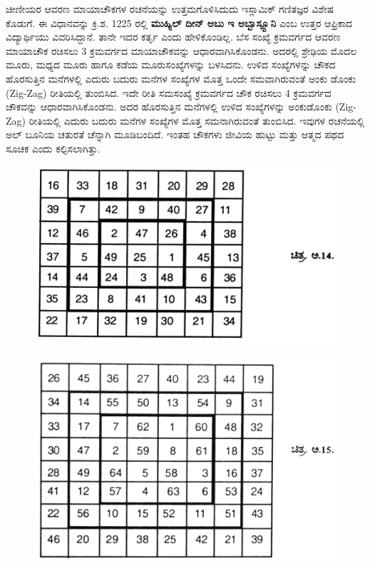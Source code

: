 ಚೀಣೀಯರ ಆವರಣ ಮಾಯಾಚೌಕಗಳ ರಚನೆಯನ್ನು ಉತ್ತಮಗೊಳಿಸಿದುದು ಇಸ್ಲಾಮಿಕ್ ಗಣಿತಜ್ಞರ ವಿಶೇಷ ಕೊಡುಗೆ. ಈ ವಿಧಾನವನ್ನು ಕ್ರಿ.ಶ. 1225 ರಲ್ಲಿ \textbf{ಮುಹ್ಯಿಲ್ ದೀನ್ ಅಬು ಇ ಅಬ್ಬಾಸ್ಲ್ಬೂನಿ } ಎಂಬ ಉತ್ತರ ಆಫ್ರಿಕಾದ ವಿದ್ಯಾರ್ಥಿಯು ವಿವರಿಸಿದ್ದಾನೆ. ತಾನೇ ಇದರ ಕರ್ತೃ ಎಂದು ಹೇಳಿಕೊಂಡಿಲ್ಲ. ಬೆಸ ಸಂಖ್ಯೆ ಕ್ರಮವರ್ಗದ ಆವರಣ ಮಾಯಾಚೌಕ ರಚಿಸಲು 3 ಕ್ರಮವರ್ಗದ ಮಾಯಾಚೌಕವನ್ನು ಆಧಾರವಾಗಿಸಿಕೊಂಡನು. ಅದರಲ್ಲಿ ಶ್ರೇಢಿಯ ಮೊದಲ ಮೂರು, ಮಧ್ಯದ ಮೂರು ಹಾಗೂ ಕಡೆಯ ಮೂರುಸಂಖ್ಯೆಗಳನ್ನು ಬಳಸಿದನು. ಉಳಿದ ಸಂಖ್ಯೆಗಳನ್ನು ಚೌಕದ ಹೊರಸುತ್ತಿನ ಮನೆಗಳಲ್ಲಿ ಎದುರು ಬದುರು ಮನೆಗಳ ಸಂಖ್ಯೆಗಳ ಮೊತ್ತ ಒಂದೇ ಸಮವಾಗಿರುವಂತೆ ಅಂಕು ಡೊಂಕು (Zig-Zag) ರೀತಿಯಲ್ಲಿ ತುಂಬಿಸಿದ. ಇದೇ ರೀತಿ ಸಮಸಂಖ್ಯೆ ಕ್ರಮವರ್ಗದ ಚೌಕ ರಚಿಸಲು 4 ಕ್ರಮವರ್ಗದ ಚೌಕವನ್ನು ಆಧಾರವಾಗಿಸಿಕೊಂಡನು. ಅದರ ಹೊರಸುತ್ತಿನ ಮನೆಗಳಲ್ಲಿ ಉಳಿದ ಸಂಖ್ಯೆಗಳನ್ನು ಅಂಕುಡೊಂಕು (Zig-Zag) ರೀತಿಯಲ್ಲಿ ಎದುರು ಬದುರು ಮನೆಗಳ ಸಂಖ್ಯೆಗಳ ಮೊತ್ತ ಸಮನಾಗಿರುವಂತೆ ತುಂಬಿಸಿದ. ಇವುಗಳ ರಚನೆಯಲ್ಲಿ ಅಲ್ ಬೂನಿಯ ಚತುರತೆ ಚೆನ್ನಾಗಿ ಮೂಡಿಬಂದಿದೆ. ಇಂತಹ ಚೌಕಗಳು ಜೀವಿಯ ಹುಟ್ಟು ಮತ್ತು ಆತ್ಮದ ಪಥದ ಸೂಚಕ ಎಂದು ಕಲ್ಪಿಸಲಾಗಿತ್ತು.
\begin{figure}[H]
\includegraphics{src/figures/chap9/fig9.10.jpg}
\end{figure}
\begin{figure}[H]
\includegraphics{src/figures/chap9/fig9.11.jpg}
\end{figure}


